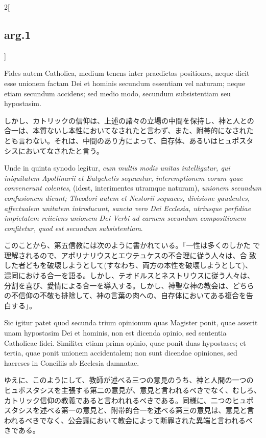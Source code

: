\documentclass[paper=a4paper,fontsize=10pt,jafontsize=9pt,titlepage]{jlreq}
\begin{document}
\begin{paracol}{2}[\subsection{arg.1}]
\switchcolumn*

Fides autem Catholica, medium tenens inter praedictas positiones,
neque dicit esse unionem factam Dei et hominis secundum essentiam vel
naturam; neque etiam secundum accidens; sed medio modo, secundum
subsistentiam seu hypostasim.

\switchcolumn

しかし、カトリックの信仰は、上述の諸々の立場の中間を保持し、神と人との
合一は、本質ないし本性においてなされたと言わず、また、附帯的になされた
とも言わない。それは、中間のあり方によって、自存体、あるいはヒュポスタ
シスにおいてなされたと言う。

\switchcolumn*

Unde in quinta synodo legitur, {\itshape cum multis modis unitas
intelligatur, qui iniquitatem Apollinarii et Eutychetis sequuntur,
interemptionem eorum quae convenerunt colentes}, (idest, interimentes
utramque naturam), {\itshape unionem secundum confusionem dicunt;
Theodori autem et Nestorii sequaces, divisione gaudentes, affectualem
unitatem introducunt, sancta vero Dei Ecclesia, utriusque perfidiae
impietatem reiiciens unionem Dei Verbi ad carnem secundum
compositionem confitetur, quod est secundum subsistentiam}.

\switchcolumn

このことから、第五信教には次のように書かれている。「一性は多くのしかた
で理解されるので、アポリナリウスとエウテュケスの不合理に従う人々は、合
致した者どもを破壊しようとして(すなわち、両方の本性を破壊しようとして)、
混同における合一を語る。しかし、テオドルスとネストリウスに従う人々は、
分割を喜び、愛情による合一を導入する。しかし、神聖な神の教会は、どちら
の不信仰の不敬も排除して、神の言葉の肉への、自存体においてある複合を告
白する」。

\switchcolumn*

Sic igitur patet quod secunda trium opinionum quas Magister ponit,
quae asserit unam hypostasim Dei et hominis, non est dicenda opinio,
sed sententia Catholicae fidei.  Similiter etiam prima opinio, quae
ponit duas hypostases; et tertia, quae ponit unionem accidentalem; non
sunt dicendae opiniones, sed haereses in Conciliis ab Ecclesia
damnatae.

\switchcolumn

ゆえに、このようにして、教師が述べる三つの意見のうち、神と人間の一つの
ヒュポスタシスを主張する第二の意見が、意見と言われるべきでなく、むしろ、
カトリック信仰の教義であると言われれるべきである。同様に、二つのヒュポ
スタシスを述べる第一の意見と、附帯的合一を述べる第三の意見は、意見と言
われるべきでなく、公会議において教会によって断罪された異端と言われるべ
きである。


\end{paracol}
\end{document}

